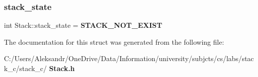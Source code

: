 \subsubsection{stack\+\_\+state}
{\footnotesize\ttfamily int Stack\+::stack\+\_\+state = \textbf{ S\+T\+A\+C\+K\+\_\+\+N\+O\+T\+\_\+\+E\+X\+I\+ST}}



The documentation for this struct was generated from the following file\+:\begin{DoxyCompactItemize}
\item 
C\+:/\+Users/\+Aleksandr/\+One\+Drive/\+Data/\+Information/university/subjcts/cs/labs/stack\+\_\+c/stack\+\_\+c/\textbf{ Stack.\+h}\end{DoxyCompactItemize}
